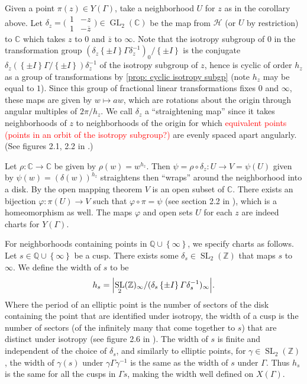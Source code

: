 \documentclass[10pt,leqno,twoside]{article}
\theoremstyle{plain}
\theoremstyle{definition}
\numberwithin{equation}{section}
\numberwithin{lem}{section}
\newcommand{\cbr}[1]{\left\{#1\right\}}
\DeclareMathOperator{\GL}{GL}
\DeclareMathOperator{\SL}{SL}
\newcommand{\slz}{\SL_2(\mathbb{Z})}
\newcommand{\sai}[1]{\textcolor{red}{#1}}
\begin{document}
Given a point $\pi(z)\in Y(\varGamma)$, take a neighborhood $U$ for $z$ as in the corollary above. Let $\delta_z  = \big(\!\begin{smallmatrix}
    1 & -z \\ 1 & -\overline{z}
\end{smallmatrix}\!\big)\in \GL_2(\mathbb C)$ be the map from $\mathcal H$ (or $U$ by restriction) to $\mathbb C$ which takes $z$ to $0$ and $\overline{z}$ to $\infty$. Note that the isotropy subgroup of $0$ in the transformation group $(\delta_z\cbr{\pm I}\varGamma\delta_z^{-1})_0/\cbr{\pm I}$ is the conjugate $\delta_z(\cbr{\pm I}\varGamma/\cbr{\pm I})\delta_z^{-1}$ of the isotropy subgroup of $z$, hence is cyclic of order $h_z$ as a group of transformations by \cref{prop: cyclic isotropy subgp} (note $h_z$ may be equal to $1$). Since this group of fractional linear transformations fixes $0$ and $\infty$, these maps are given by $w\mapsto aw$, which are rotations about the origin through angular multiples of $2\pi/h_z$. We call $\delta_z$ a ``straightening map'' since it takes neighborhoods of $z$ to neighborhoods of the origin for which \sai{equivalent points (points in an orbit of the isotropy subgroup?)} are evenly spaced apart angularly. (See figures 2.1, 2.2 in \cite{diamond}.)

Let $\rho\colon \mathbb C\to \mathbb C$ be given by $\rho(w) = w^{h_z}$. Then $\psi = \rho\circ \delta_z \colon U\to V = \psi(U)$ given by $\psi(w) = (\delta(w))^{h_z}$ straightens then ``wraps'' around the neighborhood into a disk. By the open mapping theorem $V$ is an open subset of $\mathbb C$. There exists an bijection $\varphi\colon \pi(U)\to V$ such that $\varphi\circ\pi = \psi$ (see section 2.2 in \cite{diamond}), which is a homeomorphism as well. The maps $\varphi$ and open sets $U$ for each $z$ are indeed charts for $Y(\varGamma)$.

For neighborhoods containing points in $\mathbb Q\cup\cbr{\infty}$, we specify charts as follows. Let $s\in\mathbb Q\cup\cbr{\infty}$ be a cusp. There exists some $\delta_s\in\slz$ that maps $s$ to $\infty$. We define the width of $s$ to be 
\[h_s = \abs{\slz_\infty/(\delta_s\cbr{\pm I}\varGamma\delta_s^{-1})_\infty}.\] Where the period of an elliptic point is the number of sectors of the disk containing the point that are identified under isotropy, the width of a cusp is the number of sectors (of the infinitely many that come together to $s$) that are distinct under isotropy (see figure 2.6 in \cite{diamond}). The width of $s$ is finite and independent of the choice of $\delta_s$, and similarly to elliptic points, for $\gamma\in\slz$, the width of $\gamma(s)$ under $\gamma\varGamma\gamma^{-1}$ is the same as the width of $s$ under $\varGamma$. Thus $h_s$ is the same for all the cusps in $\varGamma s$, making the width well defined on $X(\varGamma)$.
\end{document}

